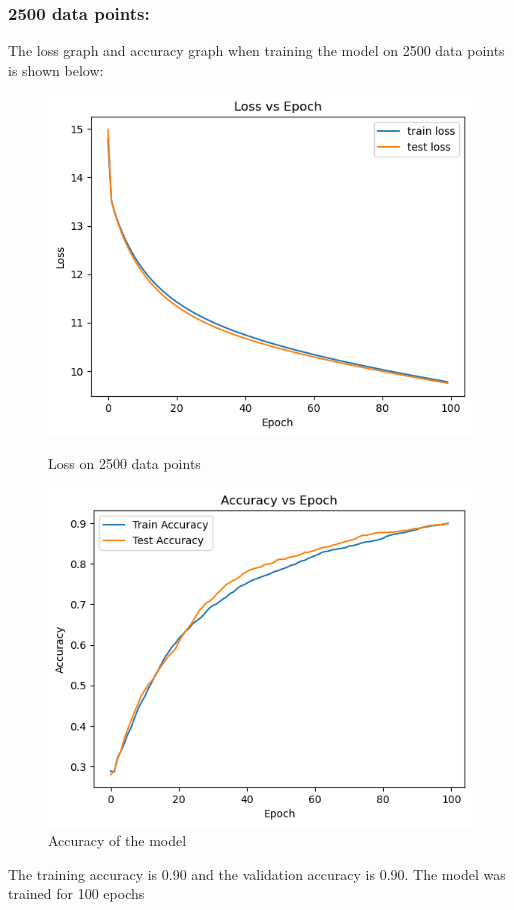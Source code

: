 \documentclass{article}
\begin{document}
\subsubsection*{2500 data points:}
The loss graph and accuracy graph when training the model on 2500 data points is shown below:
\begin{figure}[h!]
    \centering
    \begin{minipage}{0.45\textwidth}
        \centering
        \includegraphics[width=1\textwidth]{graphs/loss_2500.png} %
        \caption{Loss on 2500 data points}
    \end{minipage}\hfill
    \begin{minipage}{0.45\textwidth}
        \centering
        \includegraphics[width=1\textwidth]{graphs/accuracy_2500.png} %
        \caption{Accuracy of the model}
    \end{minipage}
\end{figure}
\newline The training accuracy is 0.90 and the validation accuracy is 0.90. The model was trained for 100 epochs
\end{document}
